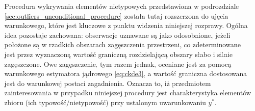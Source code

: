 \documentclass[12pt,a4paper,oneside]{book}
\theoremstyle{definition}
\begin{document}
Procedura wykrywania elementów nietypowych przedstawiona w podrozdziale \ref{sec:outliers_unconditional_procedure} została tutaj rozszerzona do ujęcia warunkowego, które jest kluczowe z punktu widzenia niniejszej rozprawy. Ogólna idea pozostaje zachowana: obserwacje uznawane są jako odosobnione, jeżeli położone są w rzadkich obszarach zagęszczenia przestrzeni, co zdeterminowane jest przez wyznaczoną wartość graniczną rozdzielającą obszary słabo i silnie zagęszczone. Owe zagęszczenie, tym razem jednak, oceniane jest za pomocą warunkowego estymatora jądrowego \eqref{eq:ckde3}, a wartość graniczna dostosowana jest do warunkowej postaci zagadnienia. Oznacza to, iż przedmiotem zainteresowania w przypadku niniejszej procedury jest charakterystyka elementów zbioru (ich typowość/nietypowość) przy ustalonym uwarunkowaniu $y^*$.
\end{document}
